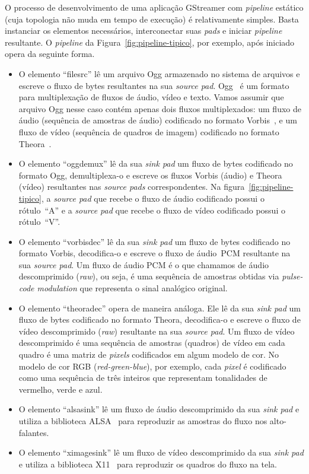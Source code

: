 \documentclass{SBCbookchapter}
\def\en#1{\foreignlanguage{english}{\emph{#1}}}
\begin{document}
O processo de desenvolvimento de uma aplicação GStreamer com \en{pipeline}
estático (cuja topologia não muda em tempo de execução) é relativamente
simples.  Basta instanciar os elementos necessários, interconectar suas
\en{pads} e iniciar \en{pipeline} resultante.  O \en{pipeline} da
Figura~\ref{fig:pipeline-tipico}, por exemplo, após iniciado opera da
seguinte forma.
\begin{itemize}
\item O elemento ``filesrc'' lê um arquivo Ogg armazenado no sistema de
  arquivos e escreve o fluxo de bytes resultantes na sua \en{source pad}.
  Ogg~\cite{ogg-rfc-3533} é um formato para multiplexação de fluxos de
  áudio, vídeo e texto.  Vamos assumir que arquivo Ogg nesse caso contém
  apenas dois fluxos multiplexados: um fluxo de áudio (sequência de amostras
  de áudio) codificado no formato Vorbis~\cite{vorbis}, e um fluxo de vídeo
  (sequência de quadros de imagem) codificado no formato
  Theora~\cite{theora}.
\item O elemento ``oggdemux'' lê da sua \en{sink pad} um fluxo de bytes
  codificado no formato Ogg, demultiplexa-o e escreve os fluxos Vorbis
  (áudio) e Theora (vídeo) resultantes nas \en{source pads} correspondentes.
  Na figura~\ref{fig:pipeline-tipico}, a \en{source pad} que recebe o fluxo
  de áudio codificado possui o rótulo~``A'' e a \en{source pad} que recebe o
  fluxo de vídeo codificado possui o rótulo~``V''.
\item O elemento ``vorbisdec'' lê da sua \en{sink pad} um fluxo de bytes
  codificado no formato Vorbis, decodifica-o e escreve o fluxo de áudio~PCM
  resultante na sua \en{source pad}.  Um fluxo de áudio PCM é o que chamamos
  de áudio descomprimido (\en{raw}), ou seja, é uma sequência de amostras
  obtidas via \en{pulse-code modulation} que representa o sinal analógico
  original.
\item O elemento ``theoradec'' opera de maneira análoga.  Ele lê da sua
  \en{sink pad} um fluxo de bytes codificado no formato Theora, decodifica-o
  e escreve o fluxo de vídeo descomprimido (\en{raw}) resultante na sua
  \en{source pad}.  Um fluxo de vídeo descomprimido é uma sequência de
  amostras (quadros) de vídeo em cada quadro é uma matriz de \en{pixels}
  codificados em algum modelo de cor.  No modelo de cor RGB
  (\en{red-green-blue}), por exemplo, cada \en{pixel} é codificado como uma
  sequência de três inteiros que representam tonalidades de vermelho, verde
  e azul.
\item O elemento ``alsasink'' lê um fluxo de áudio descomprimido da sua
  \en{sink pad} e utiliza a biblioteca ALSA~\cite{alsa} para reproduzir as
  amostras do fluxo nos alto-falantes.
\item O elemento ``ximagesink'' lê um fluxo de vídeo descomprimido da sua
  \en{sink pad} e utiliza a biblioteca X11~\cite{x11} para reproduzir os
  quadros do fluxo na tela.
\end{itemize}
\end{document}
